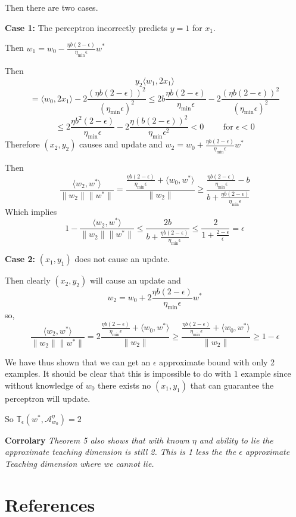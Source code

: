 \documentclass{article}
\newcommand{\learn}{\mathcal{A}_{w_0}^\eta}
\begin{document}
Then there are two cases.

\textbf{Case 1:} The perceptron incorrectly predicts $y = 1$ for $x_1$.

Then 
$
w_1 = w_0 - \frac{\eta b(2-\epsilon)}{\eta_{\min} \epsilon}w^*
$

Then 
$$y_2 \langle w_1, 2x_1 \rangle
$$
$$
 = \langle w_0, 2x_1 \rangle - 2\frac{(\eta b(2-\epsilon))^2}{(\eta_{\min}\epsilon)^2}
 \leq 2b\frac{\eta b(2-\epsilon)}{\eta_{\min}\epsilon}
-  2\frac{(\eta b(2-\epsilon))^2}{(\eta_{\min}\epsilon)^2} 
$$
$$
\leq 2\frac{\eta b^2(2-\epsilon)}{\eta_{\min}\epsilon}
-  2\frac{\eta (b(2-\epsilon))^2}{\eta_{\min}\epsilon^2}
< 0 \qquad \text{ for } \epsilon < 0
$$
Therefore $(x_2, y_2)$ causes and update and
$w_2 =  w_0 + \frac{\eta b(2-\epsilon)}{\eta_{\min} \epsilon}w^* $

Then
$$
\frac{\langle w_2 , w^* \rangle}{\lVert w_2 \rVert \lVert w^* \rVert} = \frac{\frac{\eta b(2-\epsilon)}{\eta_{\min} \epsilon} + \langle w_0, w^* \rangle}{\lVert w_2 \rVert} \geq \frac{\frac{\eta b(2-\epsilon)}{\eta_{\min} \epsilon} - b}{b + \frac{\eta b(2-\epsilon)}{\eta_{\min} \epsilon}}
$$
Which implies
$$
1 - \frac{\langle w_2 , w^* \rangle}{\lVert w_2 \rVert \lVert w^* \rVert} \leq \frac{2b}{b + \frac{\eta b(2-\epsilon)}{\eta_{\min} \epsilon}}
\leq
\frac{2}{1 + \frac{2-\epsilon}{\epsilon}} = \epsilon
$$

\textbf{Case 2:} $(x_1, y_1)$ does not cause an update.

Then clearly $(x_2, y_2)$ will cause an update and
$$
w_2 = w_0 + 2\frac{\eta b(2-\epsilon)}{\eta_{\min} \epsilon}w^* 
$$
so,
$$
\frac{\langle w_2 , w^* \rangle}{\lVert w_2 \rVert \lVert w^* \rVert} = 2\frac{\frac{\eta b(2-\epsilon)}{\eta_{\min} \epsilon} + \langle w_0, w^* \rangle}{\lVert w_2 \rVert} \geq \frac{\frac{\eta b(2-\epsilon)}{\eta_{\min} \epsilon} + \langle w_0, w^* \rangle}{\lVert w_2 \rVert} \geq 1 - \epsilon
$$

We have thus shown that we can get an $\epsilon$ approximate bound with only 2 examples. It should be clear that this is impossible to do with $1$ example since without knowledge of $w_0$ there exists no $(x_1, y_1)$ that can guarantee the perceptron will update.

So 
$
\mathbb{T}_{\epsilon}(w^*, \learn) = 2
$

\textbf{Corrolary}
\textit{
Theorem 5 also shows that with known $\eta$ and ability to lie the approximate teaching dimension is still 2. This is 1 less the the $\epsilon$ approximate Teaching dimension where we cannot lie. \cite{perceptron}
}

\section*{References}



\small


\end{document}
